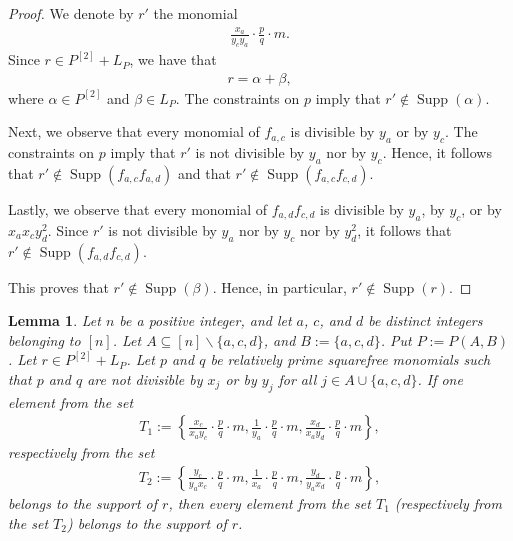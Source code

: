 \documentclass[12pt,a4paper]{amsart}
\theoremstyle{plain}
\newtheorem{lem}[thrm]{Lemma}
\def\blem{\begin{lem}}
\def\elem{\end{lem}}
\theoremstyle{definition}
\def\bproof{\begin{proof}}
\def\eproof{\end{proof}}
\theoremstyle{remark}
\let\setminus=\smallsetminus
\DeclareMathOperator{\Supp}{Supp}
\renewcommand{\subset}{\subseteq}
\begin{document}
\bproof
We denote by $r'$ the monomial 
\begin{align*}
    \frac{x_{a}}{y_{c}y_{a}} \cdot \frac{p}{q} \cdot m.
\end{align*}
Since $r \in P^{[2]} + L_{P}$, we have that
\begin{align*}
    r = \alpha + \beta,
\end{align*}
where $\alpha \in P^{[2]}$ and $\beta \in L_{P}$. The constraints on $p$ imply that $r' \notin \Supp(\alpha)$. 

Next, we observe that every monomial of $f_{a,c}$ is divisible by $y_{a}$ or by $y_{c}$. The constraints on $p$ imply that $r'$ is not divisible by $y_{a}$ nor by $y_{c}$. Hence, it follows that $r' \notin \Supp(f_{a,c}f_{a,d})$ and that $r' \notin \Supp(f_{a,c}f_{c,d})$.

Lastly, we observe that every monomial of $f_{a,d}f_{c,d}$ is divisible by $y_{a}$, by $y_{c}$, or by $x_{a}x_{c}y_{d}^{2}$. Since $r'$ is not divisible by $y_{a}$ nor by $y_{c}$ nor by $y_{d}^{2}$, it follows that $r' \notin \Supp(f_{a,d}f_{c,d})$. 

This proves that $r' \notin \Supp(\beta)$. Hence, in particular, $r' \notin \Supp(r)$.
\eproof

\blem
\label{lem:elements_in_supp_of_Q}
Let $n$ be a positive integer, and let $a$, $c$, and $d$ be distinct integers belonging to $[n]$. Let $A \subset [n] \setminus \{a,c,d\}$, and $B := \{a,c,d\}$. Put $P := P(A,B)$. Let $r \in P^{[2]} + L_{P}$. Let $p$ and $q$ be relatively prime squarefree monomials such that $p$ and $q$ are not divisible by $x_{j}$ or by $y_{j}$ for all $j \in A \cup \{a,c,d\}$. If one element from the set
\begin{align*}
     T_{1} := \left\{ \frac{x_{c}}{x_{a}y_{c}} \cdot \frac{p}{q} \cdot m, \frac{1}{y_{a}} \cdot \frac{p}{q} \cdot m, \frac{x_{d}}{x_{a}y_{d}} \cdot \frac{p}{q} \cdot m \right\},
\end{align*}
respectively from the set 
\begin{align*}
     T_{2} := \left\{ \frac{y_{c}}{y_{a}x_{c}} \cdot \frac{p}{q} \cdot m, \frac{1}{x_{a}} \cdot \frac{p}{q} \cdot m, \frac{y_{d}}{y_{a}x_{d}} \cdot \frac{p}{q} \cdot m \right\},
\end{align*}
belongs to the support of $r$, then every element from the set $T_{1}$ (respectively from the set $T_{2}$) belongs to the support of $r$.
\elem 
\end{document}
